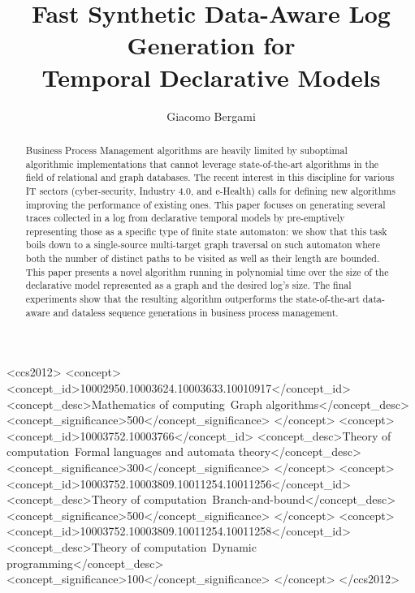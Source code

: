 \documentclass[acmengage]{acmart}
\begin{document}
	\title[Fast Synthetic Data-Aware Log Generation for Temporal Declarative Models]{Fast Synthetic Data-Aware Log Generation for\\ Temporal Declarative Models}

\author{Giacomo Bergami}


\begin{abstract}
Business Process Management algorithms are heavily limited by suboptimal algorithmic implementations that cannot leverage state-of-the-art algorithms in the field of relational and graph databases. The recent interest in this discipline for various IT sectors (cyber-security, Industry 4.0, and e-Health) calls for defining new algorithms  improving the performance of existing ones. This paper focuses on generating several traces collected in a log from declarative temporal models by pre-emptively representing those as a specific type of finite state automaton: we show that this task boils down to a single-source multi-target graph traversal on such automaton where both the number of distinct paths to be visited as well as their length are bounded. This paper presents a novel algorithm running in polynomial time over the size of the declarative model represented as a graph and the desired log's size. The final experiments show that the resulting algorithm outperforms the state-of-the-art data-aware and dataless sequence generations in business process management.
\end{abstract}


\begin{CCSXML}
<ccs2012>
   <concept>
       <concept_id>10002950.10003624.10003633.10010917</concept_id>
       <concept_desc>Mathematics of computing~Graph algorithms</concept_desc>
       <concept_significance>500</concept_significance>
       </concept>
   <concept>
       <concept_id>10003752.10003766</concept_id>
       <concept_desc>Theory of computation~Formal languages and automata theory</concept_desc>
       <concept_significance>300</concept_significance>
       </concept>
   <concept>
       <concept_id>10003752.10003809.10011254.10011256</concept_id>
       <concept_desc>Theory of computation~Branch-and-bound</concept_desc>
       <concept_significance>500</concept_significance>
       </concept>
   <concept>
       <concept_id>10003752.10003809.10011254.10011258</concept_id>
       <concept_desc>Theory of computation~Dynamic programming</concept_desc>
       <concept_significance>100</concept_significance>
       </concept>
 </ccs2012>
\end{CCSXML}
\end{document}
